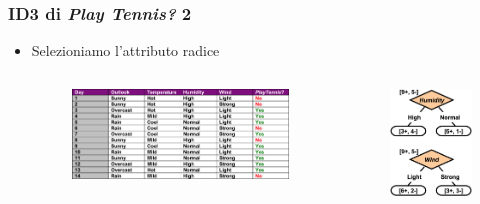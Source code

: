 \begin{frame}
	
	\frametitle{ID3 di \textit{Play Tennis?} 2}

	\begin{itemize}
		\item Selezioniamo l'attributo radice
		
		\begin{columns}
	
			\begin{figure}[!htbp]
				\centering
				\includegraphics[width=1.00\linewidth]{images/supervised/decision_trees/example_play_tennis.png}
			\end{figure}
			
			
			
			\begin{figure}[!htbp]
				\centering
				\includegraphics[width=0.75\linewidth]{images/supervised/decision_trees/example_humidity_wind.png}
			\end{figure}
			

\end{columns}
\end{itemize}
\end{frame}
